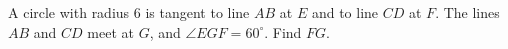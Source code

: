 A circle with radius $6$ is tangent to line $AB$ at $E$ and to line $CD$ at $F$. The lines $AB$ and $CD$ meet at $G$, and $\angle EGF=60^\circ$. Find $FG$.
